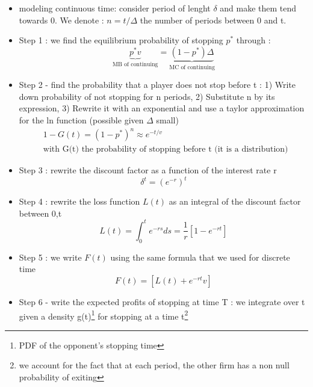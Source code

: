 \documentclass{article}
\begin{document}
\begin{itemize}
    \item modeling continuous time: consider period of lenght $\delta$ and make them tend towards 0. We denote : $n=t/\Delta$ the number of periods between 0 and t. 
    \item Step 1 :  we find the equilibrium probability of stopping $p^*$ through : 
    \begin{equation}
        \underbrace{p^*v}_{\text{MB of continuing}}=\underbrace{(1-p^*)\Delta}_{\text{MC of continuing}}
    \end{equation}
    \item Step 2 - find the probability that a player does not stop before t : 1) Write down probability of not stopping for n periods, 2) Substitute n by its expression, 3) Rewrite it with an exponential and use a taylor approximation for the ln function (possible given $\Delta$ small)
    \begin{equation}
    \begin{aligned}
        &1-G(t)=(1-p^*)^ n \approx e^{-t/v}\\
        &\text{with G(t) the probability of stopping before t (it is a distribution) }
    \end{aligned}
    \end{equation}
    \item Step 3 : rewrite the discount factor as a function of the interest rate r 
    \begin{equation}
        \delta^t=(e^{-r})^t
    \end{equation}
    \item Step 4 : rewrite the loss function $L(t)$ as an integral of the discount factor between 0,t
    \begin{equation}
        L(t) = \int_0^te^{-rs}ds = \frac{1}{r}[1-e^{-rt}]
    \end{equation}
    \item Step 5 : we write $F(t)$ using the same formula that we used for discrete time 
    \begin{equation}
        F(t) = [L(t)+e^{-rt}v]
    \end{equation}
    \item Step 6 - write the expected profits of stopping at time T : we integrate over t given a density g(t)\footnote{PDF of the opponent's stopping time} for stopping at a time t\footnote{we account for the fact that at each period, the other firm has a non null probability of exiting}
    \begin{equation}

\end{equation}
\end{itemize}
\end{document}
